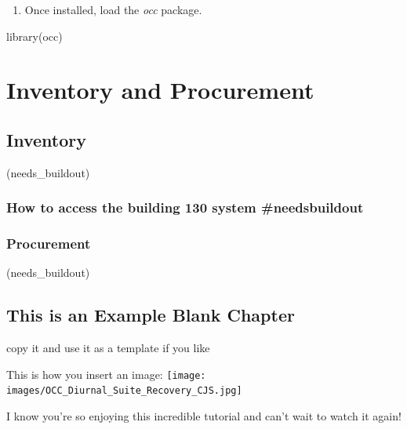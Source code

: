\documentclass[
]{book}
\newenvironment{Shaded}{\begin{snugshade}}{\end{snugshade}}
\newcommand{\FunctionTok}[1]{\textcolor[rgb]{0.00,0.00,0.00}{#1}}
\newcommand{\NormalTok}[1]{#1}
\providecommand{\tightlist}{%
  \setlength{\itemsep}{0pt}\setlength{\parskip}{0pt}}
\begin{document}
\begin{enumerate}
\def\labelenumi{\arabic{enumi}.}
\setcounter{enumi}{2}
\tightlist
\item
  Once installed, load the \emph{occ} package.
\end{enumerate}

\begin{Shaded}
\begin{Highlighting}[]
\FunctionTok{library}\NormalTok{(occ)}
\end{Highlighting}
\end{Shaded}

\hypertarget{part-inventory-and-procurement}{%
\part*{Inventory and Procurement}\label{part-inventory-and-procurement}}

\hypertarget{inventory}{%
\chapter{Inventory}\label{inventory}}

(needs\_buildout)

\hypertarget{how-to-access-the-building-130-system-needsbuildout}{%
\section{How to access the building 130 system \#needsbuildout}\label{how-to-access-the-building-130-system-needsbuildout}}

\hypertarget{procurement}{%
\section{Procurement}\label{procurement}}

(needs\_buildout)

\hypertarget{this-is-an-example-blank-chapter}{%
\chapter{This is an Example Blank Chapter}\label{this-is-an-example-blank-chapter}}

copy it and use it as a template if you like

This is how you insert an image:
\texttt{[image: images/OCC\_Diurnal\_Suite\_Recovery\_CJS.jpg]}

I know you're so enjoying this incredible tutorial and can't wait to watch it again!
\end{document}
